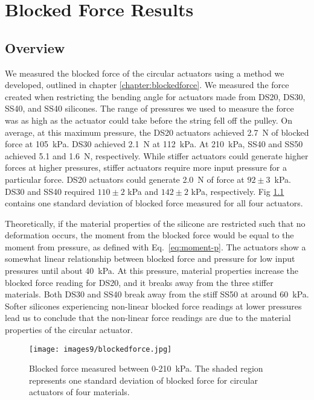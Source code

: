 \chapter{Blocked Force Results}

\section{Overview}

We measured the blocked force of the circular actuators using a method we developed, outlined in chapter \ref{chapter:blockedforce}. We measured the force created when restricting the bending angle for actuators made from DS20, DS30, SS40, and SS40 silicones. The range of pressures we used to measure the force was as high as the actuator could take before the string fell off the pulley. On average, at this maximum pressure, the DS20 actuators achieved 2.7~N of blocked force at 105~kPa. DS30 achieved 2.1~N at 112~kPa. At 210~kPa, SS40 and SS50 achieved 5.1 and 1.6~N, respectively. While stiffer actuators could generate higher forces at higher pressures, stiffer actuators require more input pressure for a particular force. DS20 actuators could generate 2.0~N of force at $92\pm3$~kPa. DS30 and SS40 required $110\pm2$ kPa and $142\pm2$ kPa, respectively. Fig \ref{fig:blockedforce} contains one standard deviation of blocked force measured for all four actuators. 

Theoretically, if the material properties of the silicone are restricted such that no deformation occurs, the moment from the blocked force would be equal to the moment from pressure, as defined with Eq.~\ref{eq:moment-p}. The actuators show a somewhat linear relationship between blocked force and pressure for low input pressures until about 40~kPa. At this pressure, material properties increase the blocked force reading for DS20, and it breaks away from the three stiffer materials. Both DS30 and SS40 break away from the stiff SS50 at around 60~kPa. Softer silicones experiencing non-linear blocked force readings at lower pressures lead us to conclude that the non-linear force readings are due to the material properties of the circular actuator.
\\
\begin{figure}[ht]
    \centering
     \texttt{[image: images9/blockedforce.jpg]}
    \caption{Blocked force measured between 0-210~kPa. The shaded region represents one standard deviation of blocked force for circular actuators of four materials.}
    \label{fig:blockedforce}
\end{figure}

